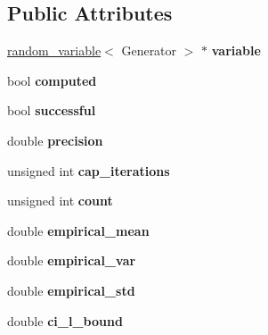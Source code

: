 \subsection*{Public Attributes}
\begin{DoxyCompactItemize}
\item 
\hyperlink{classrandom__variable}{random\+\_\+variable}$<$ Generator $>$ $\ast$ {\bfseries variable}\hypertarget{classmonte__carlo_ad179708fe615012fcaa71adfb013cf3b}{}\label{classmonte__carlo_ad179708fe615012fcaa71adfb013cf3b}

\item 
bool {\bfseries computed}\hypertarget{classmonte__carlo_a62d218e17216c5cd8db237d2e446f950}{}\label{classmonte__carlo_a62d218e17216c5cd8db237d2e446f950}

\item 
bool {\bfseries successful}\hypertarget{classmonte__carlo_a7ef35469245e3f4d91c822ece547aa66}{}\label{classmonte__carlo_a7ef35469245e3f4d91c822ece547aa66}

\item 
double {\bfseries precision}\hypertarget{classmonte__carlo_a27a554ebe8e1847fee8291ed93f24423}{}\label{classmonte__carlo_a27a554ebe8e1847fee8291ed93f24423}

\item 
unsigned int {\bfseries cap\+\_\+iterations}\hypertarget{classmonte__carlo_ac0f656225be3c3d9bf7eb0edfa4e95c6}{}\label{classmonte__carlo_ac0f656225be3c3d9bf7eb0edfa4e95c6}

\item 
unsigned int {\bfseries count}\hypertarget{classmonte__carlo_ade5ed60cafd32398a80daf71859a824e}{}\label{classmonte__carlo_ade5ed60cafd32398a80daf71859a824e}

\item 
double {\bfseries empirical\+\_\+mean}\hypertarget{classmonte__carlo_aedf0cabb9a89b2b02aa63dc8b00e34d5}{}\label{classmonte__carlo_aedf0cabb9a89b2b02aa63dc8b00e34d5}

\item 
double {\bfseries empirical\+\_\+var}\hypertarget{classmonte__carlo_af698280f1f16c333b108f06e41b45c7e}{}\label{classmonte__carlo_af698280f1f16c333b108f06e41b45c7e}

\item 
double {\bfseries empirical\+\_\+std}\hypertarget{classmonte__carlo_a22d78794a12eabe859d6249b7206aa6a}{}\label{classmonte__carlo_a22d78794a12eabe859d6249b7206aa6a}

\item 
double {\bfseries ci\+\_\+l\+\_\+bound}\hypertarget{classmonte__carlo_ad02f29a48b9977ff00ec9044bfde2f03}{}\label{classmonte__carlo_ad02f29a48b9977ff00ec9044bfde2f03}


\end{DoxyCompactItemize}
